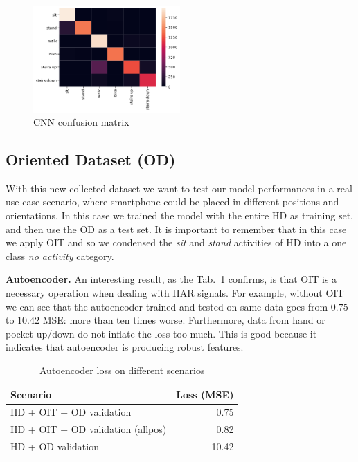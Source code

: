 \begin{figure}[h]
	\centering
	\includegraphics[width=0.5\textwidth]{images/confusion_matrix.png}
	\caption{CNN confusion matrix}
	\label{fig:cnn-confusion-matrix}
\end{figure}


\subsection{Oriented Dataset (OD)}

With this new collected dataset we want to test our model performances
in a real use case scenario, where smartphone could be placed in
different positions and orientations. In this case we trained the
model with the entire HD as training set, and then use the OD as a
test set. It is important to remember that in this case we apply OIT
and so we condensed the \textit{sit} and \textit{stand} activities of
HD into a one class \textit{no activity} category.

\textbf{Autoencoder.}  An interesting result, as the
Tab.~\ref{tab:ae-loss} confirms, is that OIT is a necessary operation
when dealing with HAR signals. For example, without OIT we can see
that the autoencoder trained and tested on same data goes from $0.75$
to $10.42$ MSE: more than ten times worse. Furthermore, data from
hand or pocket-up/down do not inflate the loss too much. This is good
because it indicates that autoencoder is producing robust features.

\begin{table}[h]
  \centering
  \begin{tabular}{lr}
    \hline
    Scenario & Loss (MSE) \\
    \hline
    HD + OIT + OD validation & 0.75 \\
    HD + OIT + OD validation (allpos) & 0.82 \\
    HD + OD validation & 10.42 \\
    \hline
  \end{tabular}
  \caption{Autoencoder loss on different scenarios}
  \label{tab:ae-loss}
\end{table}

